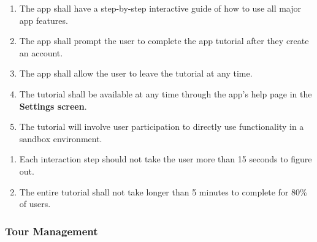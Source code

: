 \documentclass{article}
\begin{document}
\begin{enumerate}[align=left, label=\textbf{TU-FR\arabic*:}]
    \item The app shall have a step-by-step interactive guide of how to use all major app features.
    \item The app shall prompt the user to complete the app tutorial after they create an account.
    \item The app shall allow the user to leave the tutorial at any time.
    \item The tutorial shall be available at any time through the app's help page in the \textbf{Settings screen}.
    \item The tutorial will involve user participation to directly use functionality in a sandbox environment.
\end{enumerate}

\begin{enumerate}[align=left, label=\textbf{TU-NFR\arabic*:}]
    \item Each interaction step should not take the user more than 15 seconds to figure out.
    \item The entire tutorial shall not take longer than 5 minutes to complete for 80\% of users.
\end{enumerate}

\subsubsection{Tour Management}
\label{ssub:tour_management}
\end{document}
